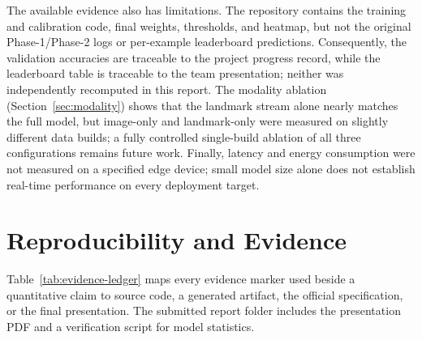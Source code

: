 \documentclass[10pt,twocolumn,a4paper]{article}
\begin{document}
The available evidence also has limitations. The repository contains the
training and calibration code, final weights, thresholds, and heatmap, but not
the original Phase-1/Phase-2 logs or per-example leaderboard predictions.
Consequently, the validation accuracies are traceable to the project progress
record, while the leaderboard table is traceable to the team presentation;
neither was independently recomputed in this report.
The modality ablation (Section~\ref{sec:modality}) shows that the landmark
stream alone nearly matches the full model, but image-only and landmark-only
were measured on slightly different data builds; a fully controlled
single-build ablation of all three configurations remains future work.
Finally,
latency and energy consumption were not measured on a specified edge device;
small model size alone does not establish real-time performance on every
deployment target.

\section{Reproducibility and Evidence}
\label{sec:evidence}

Table~\ref{tab:evidence-ledger} maps every evidence marker used beside a
quantitative claim to source code, a generated artifact, the official
specification, or the final presentation. The submitted report folder includes
the presentation PDF and a verification script for model statistics.
\end{document}
